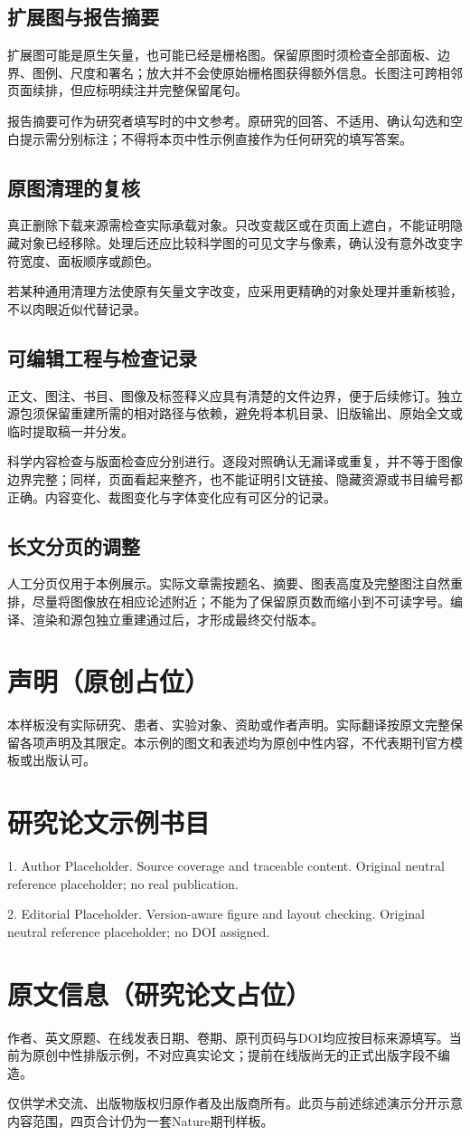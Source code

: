 \documentclass[UTF8,fontset=none,twocolumn,scheme=plain]{ctexart}
\begin{document}
\subsection*{扩展图与报告摘要}
扩展图可能是原生矢量，也可能已经是栅格图。保留原图时须检查全部面板、边界、图例、尺度和署名；放大并不会使原始栅格图获得额外信息。长图注可跨相邻页面续排，但应标明续注并完整保留尾句。\par
报告摘要可作为研究者填写时的中文参考。原研究的回答、不适用、确认勾选和空白提示需分别标注；不得将本页中性示例直接作为任何研究的填写答案。
\subsection*{原图清理的复核}
真正删除下载来源需检查实际承载对象。只改变裁区或在页面上遮白，不能证明隐藏对象已经移除。处理后还应比较科学图的可见文字与像素，确认没有意外改变字符宽度、面板顺序或颜色。\par
若某种通用清理方法使原有矢量文字改变，应采用更精确的对象处理并重新核验，不以肉眼近似代替记录。
\subsection*{可编辑工程与检查记录}
正文、图注、书目、图像及标签释义应具有清楚的文件边界，便于后续修订。独立源包须保留重建所需的相对路径与依赖，避免将本机目录、旧版输出、原始全文或临时提取稿一并分发。\par
科学内容检查与版面检查应分别进行。逐段对照确认无漏译或重复，并不等于图像边界完整；同样，页面看起来整齐，也不能证明引文链接、隐藏资源或书目编号都正确。内容变化、裁图变化与字体变化应有可区分的记录。
\subsection*{长文分页的调整}
人工分页仅用于本例展示。实际文章需按题名、摘要、图表高度及完整图注自然重排，尽量将图像放在相应论述附近；不能为了保留原页数而缩小到不可读字号。编译、渲染和源包独立重建通过后，才形成最终交付版本。
\section*{声明（原创占位）}
本样板没有实际研究、患者、实验对象、资助或作者声明。实际翻译按原文完整保留各项声明及其限定。本示例的图文和表述均为原创中性内容，不代表期刊官方模板或出版认可。
\section*{研究论文示例书目}
{\fontsize{7.6bp}{9.6bp}\selectfont
\noindent\hypertarget{article-ref:1}{1.} Author Placeholder. Source coverage and traceable content. Original neutral reference placeholder; no real publication.\par
\noindent\hypertarget{article-ref:2}{2.} Editorial Placeholder. Version-aware figure and layout checking. Original neutral reference placeholder; no DOI assigned.\par}
\section*{原文信息（研究论文占位）}
作者、英文原题、在线发表日期、卷期、原刊页码与DOI均应按目标来源填写。当前为原创中性排版示例，不对应真实论文；提前在线版尚无的正式出版字段不编造。\par
仅供学术交流、出版物版权归原作者及出版商所有。此页与前述综述演示分开示意内容范围，四页合计仍为一套Nature期刊样板。
\end{document}
